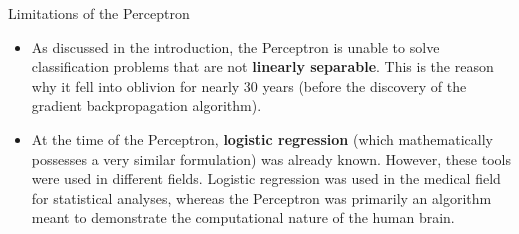 \begin{frame}{Limitations of the Perceptron}
	\begin{itemize}
		\item As discussed in the introduction, the Perceptron is unable to solve classification problems that are not \textbf{linearly separable}. This is the reason why it fell into oblivion for nearly 30 years (before the discovery of the gradient backpropagation algorithm).
		\item At the time of the Perceptron, \textbf{logistic regression} (which mathematically possesses a very similar formulation) was already known. However, these tools were used in different fields. Logistic regression was used in the medical field for statistical analyses, whereas the Perceptron was primarily an algorithm meant to demonstrate the computational nature of the human brain.
	\end{itemize}
\end{frame}
